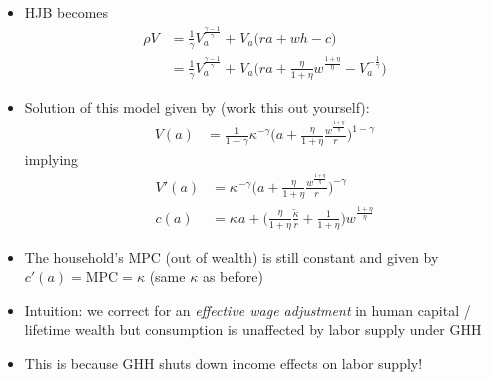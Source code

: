 \documentclass[10pt]{beamer}
\begin{document}
\begin{frame}{}
\begin{itemize}
\item HJB becomes
\begin{align*}
	\rho V &= \frac{1}{\gamma} V_a^\frac{\gamma-1}{\gamma} + V_a \Big( ra + w h - c \Big) \\
	&= \frac{1}{\gamma} V_a^\frac{\gamma-1}{\gamma} + V_a \bigg( ra + \frac{\eta}{1 + \eta} w^\frac{1+\eta}{\eta} - V_a^{- \frac{1}{\gamma}} \bigg)
\end{align*}

\item Solution of this model given by (work this out yourself):
\begin{align*}
	V(a) &= \frac{1}{1-\gamma} \kappa^{-\gamma} \bigg( a + \frac{\eta}{1+\eta} \frac{w^\frac{1+\eta}{\eta}}{r} \bigg)^{1-\gamma}
\end{align*}
implying
\begin{align*}
	V'(a) &= \kappa^{-\gamma} \bigg( a + \frac{\eta}{1+\eta} \frac{w^\frac{1+\eta}{\eta}}{r} \bigg)^{-\gamma} \\
	c(a) &= \kappa a + \bigg( \frac{\eta}{1+\eta} \frac{\tilde \kappa}{r} + \frac{1}{1+\eta} \bigg) w^\frac{1+\eta}{\eta}
\end{align*}
\end{itemize}
\end{frame}




\begin{frame}{}
\begin{itemize}
\item The household's MPC (out of wealth) is still constant and given by $c'(a) = \text{MPC} = \kappa$ (same $\kappa$ as before)

\item Intuition: we correct for an \textit{effective wage adjustment} in human capital / lifetime wealth but consumption is unaffected by labor supply under GHH

\item This is because GHH shuts down income effects on labor supply!

\end{itemize}
\end{frame}
\end{document}
